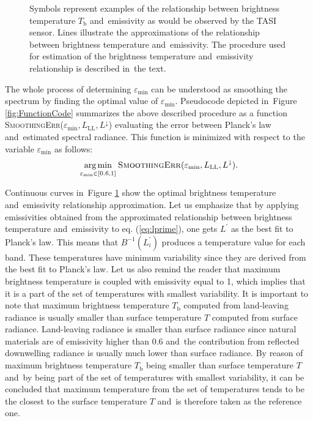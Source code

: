 \begin{figure}[!t]
\begin{subfigure}[t]{.3\linewidth}
		\caption{}
	\end{subfigure}
	\vspace{1.5 em}
	\caption{Symbols represent examples of the relationship between brightness temperature $T_\mathrm{b}$ and~emissivity as would be observed by the TASI sensor. Lines illustrate the approximations of the relationship between brightness temperature and~emissivity. The procedure used for estimation of the brightness temperature and~emissivity relationship is described in~the text.}
\label{fig:relationship}
\end{figure}

The whole process of determining $\varepsilon_\mathrm{min}$ can be understood as smoothing the spectrum by finding the optimal value of $\varepsilon_\mathrm{min}$. Pseudocode depicted in~Figure \ref{fig:FunctionCode} summarizes the above described procedure as a function \textsc{SmoothingErr}($\varepsilon_\mathrm{min},L_\mathrm{LL},L^\downarrow$) evaluating the error between Planck's law and~estimated spectral radiance. This function is minimized with respect to the variable $\varepsilon_\mathrm{min}$ as follows:
\begin{equation*}
\underset{\varepsilon_\mathrm{min} \in  {[0.6,1]}}{\text{arg\,min}}\:\text{\textsc{SmoothingErr}}(\varepsilon_\mathrm{min},L_\mathrm{LL},L^\downarrow).
\label{eq:costFunction}
\end{equation*}

Continuous curves in~Figure \ref{fig:relationship} show the optimal brightness temperature and~emissivity relationship approximation. Let us emphasize that by applying emissivities obtained from the approximated relationship between brightness temperature and~emissivity to eq. (\ref{eq:lprime}), one gets $L^\prime$ as the best fit to Planck's law. This means that $B^{-1}(L^\prime_i)$ produces a temperature value for each band. These temperatures have minimum variability since they are derived from the best fit to Planck's law. Let us also remind the reader that maximum brightness temperature is coupled with emissivity equal to 1, which implies that it is a part of the set of temperatures with smallest variability. It is important to note that maximum brightness temperature $T_\mathrm{b}$ computed from land-leaving radiance is usually smaller than surface temperature $T$ computed from surface radiance. Land-leaving radiance is smaller than surface radiance since natural materials are of emissivity higher than $0.6$ and~the contribution from reflected downwelling radiance is usually much lower than surface radiance. By reason of maximum brightness temperature $T_\mathrm{b}$ being smaller than surface temperature $T$ and~by being part of the set of temperatures with smallest variability, it can be concluded that maximum temperature from the set of temperatures tends to be the closest to the surface temperature $T$ and~is therefore taken as the reference one.

